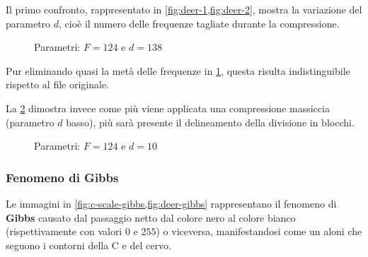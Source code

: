 \documentclass[11pt,italian]{article}
\begin{document}
\noindent
Il primo confronto, rappresentato in \cref{fig:deer-1,fig:deer-2}, mostra la variazione del parametro $d$, cioè il numero delle frequenze tagliate durante la compressione.
\begin{figure}[H]
    \caption{Parametri: $F=124$ e $d=138$}
    \label{fig:deer-1}
\end{figure}

\noindent
Pur eliminando quasi la metà delle frequenze in \cref{fig:deer-1}, questa risulta indistinguibile rispetto al file originale.

\noindent
La \cref{fig:deer-2} dimostra invece come più viene applicata una compressione massiccia (parametro $d$ basso), più sarà presente il delineamento della divisione in blocchi.
\begin{figure}[H]
    \caption{Parametri: $F=124$ e $d=10$}
    \label{fig:deer-2}
\end{figure}

\subsubsection*{Fenomeno di Gibbs}
Le immagini in \cref{fig:c-scale-gibbs,fig:deer-gibbs} rappresentano il fenomeno di \textbf{Gibbs} causato dal passaggio netto dal colore nero al colore bianco (rispettivamente con valori $0$ e $255$) o viceversa, manifestandosi come un aloni che seguono i contorni della C e del cervo.
\end{document}
